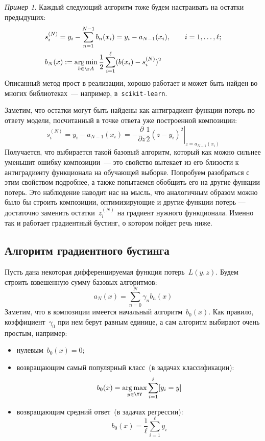 \documentclass[a4paper, 12pt]{article}
\newcommand{\argmin}{\mathop{\rm arg\,min}\limits}
\newcommand{\argmax}{\mathop{\rm arg\,max}\limits}
\theoremstyle{plain} %
\theoremstyle{definition} %
\theoremstyle{remark} %
\newtheorem{example}{Пример}
\begin{document}
\begin{example}
Каждый следующий алгоритм тоже будем настраивать на остатки предыдущих:
\begin{align*}
    &s_i^{(N)}
    =
    y_i - \sum_{n = 1}^{N - 1} b_n(x_i)
    =
    y_i
    -
    a_{N - 1}(x_i),
    \qquad
    i = 1, \dots, \ell;\\
    &b_N(x)
    :=
    \argmin_{b \in \AA}
        \frac12
        \sum_{i = 1}^{\ell}
            (b(x_i) - s_i^{(N)})^2
\end{align*}
Описанный метод прост в реализации,
хорошо работает и может быть найден во многих библиотеках~---
например, в~\texttt{scikit-learn}.

Заметим, что остатки могут быть найдены как антиградиент функции потерь по ответу модели,
посчитанный в точке ответа уже построенной композиции:
\[
    s_i^{(N)}
    =
    y_i
    -
    a_{N - 1}(x_i)
    =
    -
    \left.
    \frac{\partial}{\partial z}
    \frac12
    (z - y_i)^2
    \right|_{z = a_{N - 1}(x_i)}
\]
Получается, что выбирается такой базовый алгоритм, который как можно
сильнее уменьшит ошибку композиции~--- это свойство вытекает из его близости
к антиградиенту функционала на обучающей выборке.
Попробуем разобраться с этим свойством подробнее, а также попытаемся обобщить его
на другие функции потерь.
Это наблюдение наводит нас на мысль, что аналогичным образом можно было бы строить композиции, оптимизирующие и другие функции потерь --- достаточно заменить остатки~$z_i^{(N)}$ на градиент нужного функционала. Именно так и работает градиентный бустинг, о котором пойдет речь ниже.

\subsection{Алгоритм градиентного бустинга}

Пусть дана некоторая дифференцируемая функция потерь~$L(y, z)$.
Будем строить взвешенную сумму базовых алгоритмов:
\[
    a_N(x)
    =
    \sum_{n = 0}^{N}
        \gamma_n b_n(x)
\]
Заметим, что в композиции имеется начальный алгоритм~$b_0(x)$.
Как правило, коэффициент~$\gamma_0$ при нем берут равным единице,
а сам алгоритм выбирают очень простым, например:
\begin{itemize}
    \item нулевым~$b_0(x) = 0$;
    \item возвращающим самый популярный класс~(в задачах классификации):
        \[
            b_0(x) = \argmax_{y \in \YY} \sum_{i = 1}^{\ell} [y_i = y]
        \]
    \item возвращающим средний ответ~(в задачах регрессии):
        \[
            b_0(x) = \frac{1}{\ell} \sum_{i = 1}^{\ell} y_i
        \]
\end{itemize}


\end{example}
\end{document}
